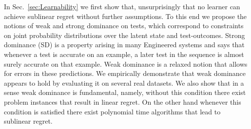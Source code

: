 

In Sec.~\ref{sec:Learnability} we first show that, unsurprisingly that no learner can achieve sublinear regret without further assumptions. %
To this end we propose the notions of weak and strong dominance on tests, which correspond to constraints on joint probability distributions over the latent state and test-outcomes. Strong dominance (SD) is a property arising in many Engineered systems and says that whenever a test is accurate on an example, a later test in the sequence is almost surely accurate on that example. %
Weak dominance is a relaxed notion that allows for errors in these predictions. We empirically demonstrate that weak dominance appears to hold by evaluating it on several real datasets. We also show that in a sense weak dominance is fundamental, namely, without this condition there exist problem instances that result in linear regret. On the other hand whenever this condition is satisfied there exist polynomial time algorithms that lead to sublinear regret. 

